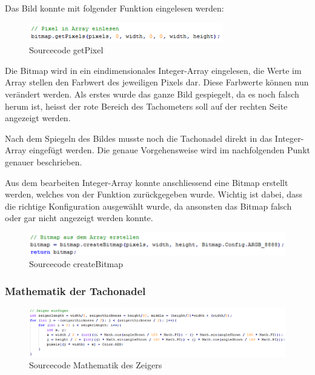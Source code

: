 Das Bild konnte mit folgender Funktion eingelesen werden:

\begin{figure}[ht]
    \includegraphics{3Vorgehen/imag/app_getPixel.png}
    \caption{Sourcecode getPixel}
	\label{app_getPixel} 
\end{figure}

Die Bitmap wird in ein eindimensionales Integer-Array eingelesen, die Werte im Array stellen den Farbwert des jeweiligen Pixels dar. Diese Farbwerte können nun verändert werden. Als erstes wurde das ganze Bild gespiegelt, da es noch falsch herum ist, heisst der rote Bereich des Tachometers soll auf der rechten Seite angezeigt werden.

Nach dem Spiegeln des Bildes musste noch die Tachonadel direkt in das Integer-Array eingefügt werden. Die genaue Vorgehensweise wird im nachfolgenden Punkt genauer beschrieben.

Aus dem bearbeiten Integer-Array konnte anschliessend eine Bitmap erstellt werden, welches von der Funktion zurückgegeben wurde. Wichtig ist dabei, dass die richtige Konfiguration ausgewählt wurde, da ansonsten das Bitmap falsch oder gar nicht angezeigt werden konnte.

\begin{figure}[ht]
    \includegraphics{3Vorgehen/imag/app_createBitmap.png}
    \caption{Sourcecode createBitmap}
	\label{app_createBitmap} 
\end{figure}

\subsubsection{Mathematik der Tachonadel}

\begin{figure}[ht]
    \includegraphics{3Vorgehen/imag/app_drawNeedle.png}
    \caption{Sourcecode Mathematik des Zeigers}
	\label{app_drawNeedle} 
\end{figure}

